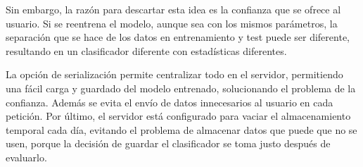 Sin embargo, la razón para descartar esta idea es la confianza que se ofrece al
usuario. Si se reentrena el modelo, aunque sea con los mismos parámetros, la
separación que se hace de los datos en entrenamiento y test puede ser diferente,
resultando en un clasificador diferente con estadísticas diferentes.

La opción de serialización permite centralizar todo en el servidor, permitiendo
una fácil carga y guardado del modelo entrenado, solucionando el problema de la
confianza. Además se evita el envío de datos innecesarios al usuario en cada
petición. Por último, el servidor está configurado para vaciar el almacenamiento
temporal cada día, evitando el problema de almacenar datos que puede que no se
usen, porque la decisión de guardar el clasificador se toma justo después de
evaluarlo. 
